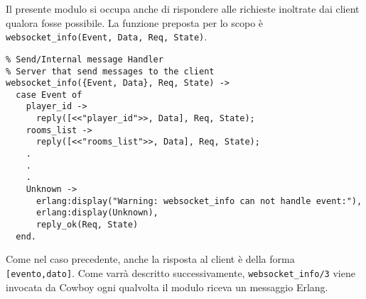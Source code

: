 \documentclass[paper=a4, fontsize=11pt]{scrartcl} %
\numberwithin{equation}{section} %
\numberwithin{figure}{section} %
\numberwithin{table}{section} %
\begin{document}
Il presente modulo si occupa anche di rispondere alle richieste inoltrate dai client qualora fosse possibile. La funzione preposta per lo scopo è \texttt{websocket\_info({Event, Data}, Req, State)}.
\begin{lstlisting}
% Send/Internal message Handler
% Server that send messages to the client
websocket_info({Event, Data}, Req, State) ->
  case Event of
    player_id ->
      reply([<<"player_id">>, Data], Req, State);
    rooms_list ->
      reply([<<"rooms_list">>, Data], Req, State);
    .
    .
    .
    Unknown ->
      erlang:display("Warning: websocket_info can not handle event:"),
      erlang:display(Unknown),
      reply_ok(Req, State)
  end.
\end{lstlisting}
Come nel caso precedente, anche la risposta al client è della forma \texttt{[evento,dato]}. Come varrà descritto successivamente, \texttt{websocket\_info/3} viene invocata da Cowboy ogni qualvolta il modulo riceva un messaggio Erlang.
\end{document}

